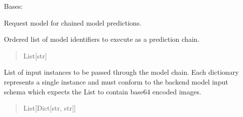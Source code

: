 \documentclass[letterpaper,10pt,english]{sphinxmanual}
\begin{document}
\begin{fulllineitems}
\label{\detokenize{modules/src.pig_sorting_api.main:src.pig_sorting_api.main.ChainPredictionRequest}}
\pysigstartsignatures
\pysiglinewithargsret
{}
{\sphinxparamcomma {}}
{}
\pysigstopsignatures
\sphinxAtStartPar
Bases: 

\sphinxAtStartPar
Request model for chained model predictions.

\begin{fulllineitems}
\label{\detokenize{modules/src.pig_sorting_api.main:src.pig_sorting_api.main.ChainPredictionRequest.model_names}}
\pysigstartsignatures
\pysigline
{}
\pysigstopsignatures
\sphinxAtStartPar
Ordered list of model identifiers to
execute as a prediction chain.
\begin{quote}\begin{description}
\sphinxAtStartPar
List{[}str{]}

\end{description}\end{quote}

\end{fulllineitems}


\begin{fulllineitems}
\label{\detokenize{modules/src.pig_sorting_api.main:src.pig_sorting_api.main.ChainPredictionRequest.instances}}
\pysigstartsignatures
\pysigline
{}
\pysigstopsignatures
\sphinxAtStartPar
List of input instances to be
passed through the model chain. Each dictionary represents
a single instance and must conform to the backend model
input schema which expects the List to contain base64 encoded images.
\begin{quote}\begin{description}
\sphinxAtStartPar
List{[}Dict{[}str, str{]}{]}


\end{description}
\end{quote}
\end{fulllineitems}
\end{fulllineitems}
\end{document}
